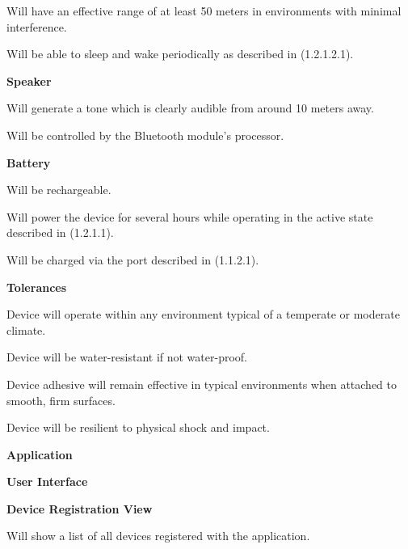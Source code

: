 \documentclass[12pt]{article}
\begin{document}
\begin{packed_enum}
\begin{packed_enum}
\begin{packed_enum}
\begin{packed_enum}
		  				\item Will have an effective range of at least 50 meters in environments with minimal interference.
		  				\item Will be able to sleep and wake periodically as described in (1.2.1.2.1).
		  				\end{packed_enum}
		  			\item \textbf{Speaker}
		  			\begin{packed_enum}
		  				\item Will generate a tone which is clearly audible from around 10 meters away.
		  				\item Will be controlled by the Bluetooth module's processor.
		  				\end{packed_enum}
		  			\item \textbf{Battery}
		  			\begin{packed_enum}
		  				\item Will be rechargeable.
		  				\item Will power the device for several hours while operating in the active state described in (1.2.1.1).
		  				\item Will be charged via the port described in (1.1.2.1).
		  				\end{packed_enum}
		  		\end{packed_enum}
		  		\item \textbf{Tolerances}
		  		\begin{packed_enum}
		  			\item Device will operate within any environment typical of a temperate or moderate climate.
		  			\item Device will be water-resistant if not water-proof.
		  			\item Device adhesive will remain effective in typical environments when attached to smooth, firm surfaces.
		  			\item Device will be resilient to physical shock and impact.
		  			\end{packed_enum}
		  	\end{packed_enum}
		  	\item \textbf{Application}
		  	\begin{packed_enum}
		  		\item \textbf{User Interface}
		  		\begin{packed_enum}
		  			\item \textbf{Device Registration View}		  			\begin{packed_enum}
		  				\item Will show a list of all devices registered with the application.

\end{packed_enum}
\end{packed_enum}
\end{packed_enum}
\end{packed_enum}
\end{document}
